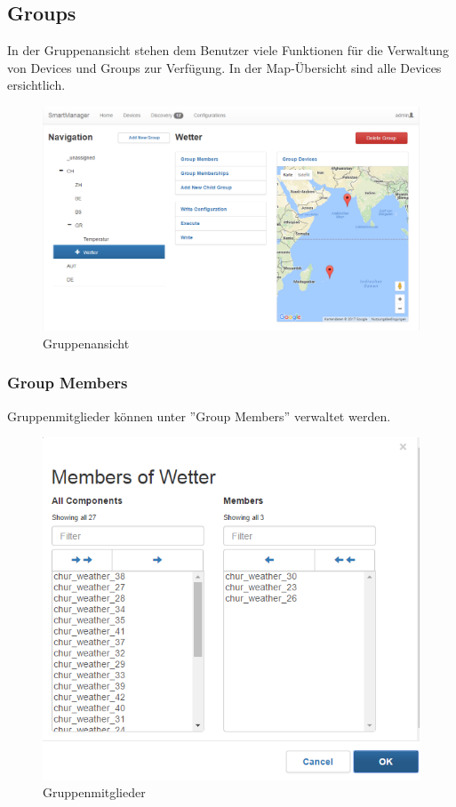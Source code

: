 \subsection{Groups}
In der Gruppenansicht stehen dem Benutzer viele Funktionen für die Verwaltung von Devices und Groups zur Verfügung. In der Map-Übersicht sind alle Devices ersichtlich.

\begin{figure}[H]
\centering
\includegraphics[scale=0.57]{../04_Realisierung/images/userinterface/groups.png}
\caption{Gruppenansicht}
\end{figure}

\subsubsection{Group Members}
Gruppenmitglieder können unter ''Group Members'' verwaltet werden. 

\begin{figure}[H]
\centering
\includegraphics[scale=0.8]{../04_Realisierung/images/userinterface/groupmembers.png}
\caption{Gruppenmitglieder}
\end{figure}

